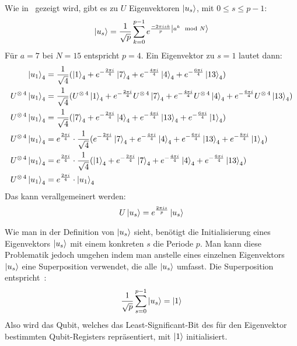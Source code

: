 Wie in~\cite[227]{nielsen_chuang_2010} gezeigt wird, gibt es zu \(U\) Eigenvektoren \(\ket{u_s}\), 
mit \(0 \leq s \leq p-1\): 
\[\ket{u_s} =
\frac{1}{\sqrt{p}}
\sum_{k=0}^{p-1} e^{\frac{-2 \pi i s k}{p}\ket{a^k \mod N}} %
\]
Für \(a=7\) bei \(N=15\) entspricht \(p=4\).
Ein Eigenvektor zu \(s=1\) lautet dann:
\begin{align*}
    \ket{u_1}_4 &=
    \frac{1}{\sqrt{4}}(
        \ket{1}_4 + 
        e^{-\frac{2 \pi i}{4}}\ket{7}_4 + 
        e^{-\frac{4 \pi i}{4}}\ket{4}_4+ 
        e^{-\frac{6 \pi i}{4}}\ket{13}_4
    )\\   
    U^{\operatorname{\otimes} 4}\ket{u_1}_4 &=
    \frac{1}{\sqrt{4}}(
        U^{\operatorname{\otimes} 4}\ket{1}_4 + 
        e^{-\frac{2 \pi i}{4}}U^{\operatorname{\otimes} 4}\ket{7}_4 + 
        e^{-\frac{4 \pi i}{4}}U^{\operatorname{\otimes} 4}\ket{4}_4+ 
        e^{-\frac{6 \pi i}{4}}U^{\operatorname{\otimes} 4}\ket{13}_4
    )\\
    U^{\operatorname{\otimes} 4}\ket{u_1}_4 &=
    \frac{1}{\sqrt{4}}(
        \ket{7}_4 + 
        e^{-\frac{2 \pi i}{4}}\ket{4}_4 + 
        e^{-\frac{4 \pi i}{4}}\ket{13}_4+ 
        e^{-\frac{6 \pi i}{4}}\ket{1}_4
    )\\
    U^{\operatorname{\otimes} 4}\ket{u_1}_4 &=
    e^{\frac{2 \pi i}{4}}
    \cdot
    \frac{1}{\sqrt{4}}(
        e^{-\frac{2 \pi i}{4}}\ket{7}_4 + 
        e^{-\frac{4 \pi i}{4}}\ket{4}_4 + 
        e^{-\frac{6 \pi i}{4}}\ket{13}_4+ 
        e^{-\frac{8 \pi i}{4}}\ket{1}_4
    )\\
    U^{\operatorname{\otimes} 4}\ket{u_1}_4 &=
    e^{\frac{2 \pi i}{4}}
    \cdot
    \frac{1}{\sqrt{4}}(
        \ket{1}_4 +
        e^{-\frac{2 \pi i}{4}}\ket{7}_4 + 
        e^{-\frac{4 \pi i}{4}}\ket{4}_4 + 
        e^{-\frac{6 \pi i}{4}}\ket{13}_4 )\\
    U^{\operatorname{\otimes} 4}\ket{u_1}_4&=
    e^{\frac{2 \pi i}{4}} \cdot
    \ket{u_1}_4
\end{align*}
Das kann verallgemeinert werden:
\[U\ket{u_s} = e^{\frac{2 \pi i s}{p}}\ket{u_s}\]

Wie man in der Definition von \(\ket{u_s}\) 
sieht, 
benötigt die Initialisierung eines Eigenvektors \(\ket{u_s}\) mit einem konkreten \(s\) die Periode \(p\).
Man kann diese Problematik jedoch umgehen indem man anstelle eines einzelnen Eigenvektors \(\ket{u_s}\)
eine Superposition verwendet, die alle \(\ket{u_s}\) umfasst.
Die Superposition entspricht~\autocite[227]{nielsen_chuang_2010}:
\[\frac{1}{\sqrt{p}} \sum_{s=0}^{p-1}\ket{u_s} = \ket{1}\] 
Also wird das Qubit, welches das Least-Significant-Bit des für den Eigenvektor bestimmten Qubit-Registers repräsentiert, 
mit \(\ket{1}\) initialisiert.

